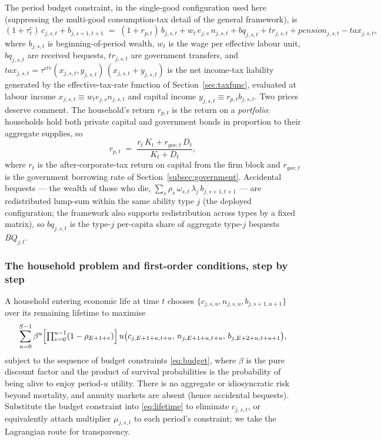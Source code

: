 The period budget constraint, in the single-good configuration used here (suppressing the multi-good consumption-tax detail of the general framework), is
\begin{equation}
\label{eq:budget}
(1+\tau^c_t)\,c_{j,s,t} + b_{j,s+1,t+1}
\;=\; (1+r_{p,t})\,b_{j,s,t} + w_t\, e_{j,s}\, n_{j,s,t}
+ bq_{j,s,t} + tr_{j,s,t} + pension_{j,s,t} - tax_{j,s,t},
\end{equation}
where $b_{j,s,t}$ is beginning-of-period wealth, $w_t$ is the wage per effective labour unit, $bq_{j,s,t}$ are received bequests, $tr_{j,s,t}$ are government transfers, and $tax_{j,s,t} = \tau^{etr}(x_{j,s,t},y_{j,s,t})\,(x_{j,s,t}+y_{j,s,t})$ is the net income-tax liability generated by the effective-tax-rate function of Section~\ref{sec:taxfunc}, evaluated at labour income $x_{j,s,t}\equiv w_t e_{j,s} n_{j,s,t}$ and capital income $y_{j,s,t}\equiv r_{p,t} b_{j,s,t}$. Two prices deserve comment. The household's return $r_{p,t}$ is the return on a \emph{portfolio}: households hold both private capital and government bonds in proportion to their aggregate supplies, so
\begin{equation}
\label{eq:rport}
r_{p,t} \;=\; \frac{r_t\,K_t + r_{gov,t}\,D_t}{K_t + D_t},
\end{equation}
where $r_t$ is the after-corporate-tax return on capital from the firm block and $r_{gov,t}$ is the government borrowing rate of Section~\ref{subsec:government}. Accidental bequests --- the wealth of those who die, $\sum_s \rho_s\,\omega_{s,t}\,\lambda_j\,b_{j,s+1,t+1}$ --- are redistributed lump-sum within the same ability type $j$ (the deployed configuration; the framework also supports redistribution across types by a fixed matrix), so $bq_{j,s,t}$ is the type-$j$ per-capita share of aggregate type-$j$ bequests $BQ_{j,t}$.

\subsubsection{The household problem and first-order conditions, step by step}
\label{subsubsec:hhfocs}

A household entering economic life at time $t$ chooses $\{c_{j,s,u},n_{j,s,u},b_{j,s+1,u+1}\}$ over its remaining lifetime to maximise
\begin{equation}
\label{eq:lifetime}
\sum_{u=0}^{S-1}\beta^{u}\Bigl[\textstyle\prod_{v=0}^{u-1}(1-\rho_{E+1+v})\Bigr]\,
u\bigl(c_{j,E+1+u,t+u},\,n_{j,E+1+u,t+u},\,b_{j,E+2+u,t+u+1}\bigr),
\end{equation}
subject to the sequence of budget constraints \eqref{eq:budget}, where $\beta$ is the pure discount factor and the product of survival probabilities is the probability of being alive to enjoy period-$u$ utility. There is no aggregate or idiosyncratic risk beyond mortality, and annuity markets are absent (hence accidental bequests). Substitute the budget constraint into \eqref{eq:lifetime} to eliminate $c_{j,s,t}$, or equivalently attach multiplier $\mu_{j,s,t}$ to each period's constraint; we take the Lagrangian route for transparency.

